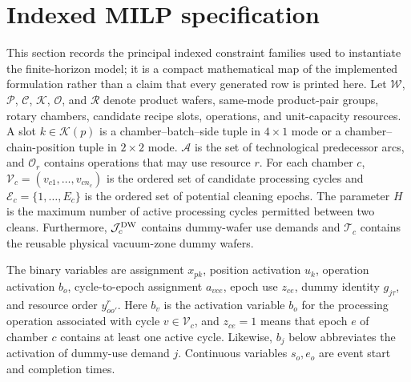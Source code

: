\documentclass[11pt]{article}
\begin{document}
\section{Indexed MILP specification}

This section records the principal indexed constraint families used to
instantiate the finite-horizon model; it is a compact mathematical map of the
implemented formulation rather than a claim that every generated row is
printed here. Let $\mathcal W$, $\mathcal P$, $\mathcal C$, $\mathcal K$,
$\mathcal O$, and $\mathcal R$ denote product wafers, same-mode product-pair
groups, rotary chambers, candidate recipe slots, operations, and unit-capacity
resources. A slot $k\in\mathcal K(p)$ is a chamber--batch--side tuple in
$4\times1$ mode or a chamber--chain-position tuple in $2\times2$ mode.
$\mathcal A$ is the set of technological predecessor arcs, and
$\mathcal O_r$ contains operations that may use resource $r$. For each chamber
$c$, $\mathcal V_c=(v_{c1},\ldots,v_{c n_c})$ is the ordered set of candidate
processing cycles and $\mathcal E_c=\{1,\ldots,E_c\}$ is the ordered set of
potential cleaning epochs. The parameter $H$ is the maximum number of active
processing cycles permitted between two cleans. Furthermore,
$\mathcal J_c^{\rm DW}$ contains dummy-wafer use demands and $\mathcal T_c$
contains the reusable physical vacuum-zone dummy wafers.

The binary variables are assignment $x_{pk}$, position activation $u_k$,
operation activation $b_o$, cycle-to-epoch assignment $a_{vce}$, epoch use
$z_{ce}$, dummy identity $g_{j\tau}$, and resource order $y^r_{oo'}$. Here
$b_v$ is the activation variable $b_o$ for the processing operation associated
with cycle $v\in\mathcal V_c$, and $z_{ce}=1$ means that epoch $e$ of chamber
$c$ contains at least one active cycle. Likewise, $b_j$ below abbreviates the
activation of dummy-use demand $j$. Continuous variables $s_o,e_o$ are event
start and completion times.
\end{document}
